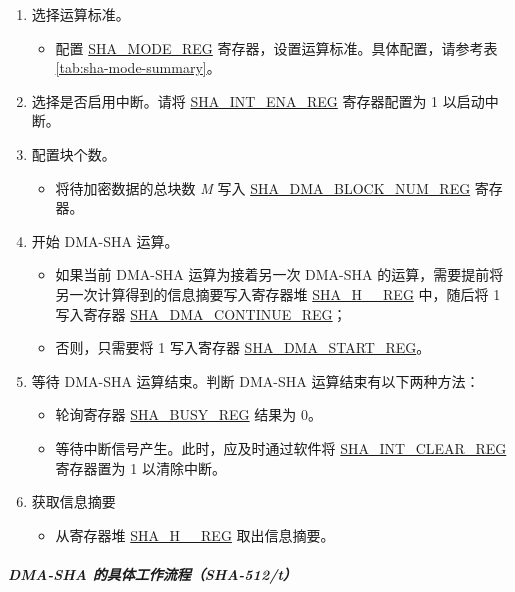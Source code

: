 \documentclass[main\_\_CN.tex]{subfiles}
\begin{document}
\begin{enumerate}
    \item 选择运算标准。
    \begin{itemize}
        \item 配置 \hyperref[regdesc:SHAMODEREG]{SHA\_MODE\_REG} 寄存器，设置运算标准。具体配置，请参考表 \ref{tab:sha-mode-summary}。
    \end{itemize}
    \item 选择是否启用中断。请将 \hyperref[regdesc:SHAINTENAREG]{SHA\_INT\_ENA\_REG} 寄存器配置为 1 以启动中断。
    \item 配置块个数。
    \begin{itemize}
        \item  将待加密数据的总块数 {\it{M}} 写入  \hyperref[regdesc:SHADMABLOCKNUMREG]{SHA\_DMA\_BLOCK\_NUM\_REG} 寄存器。
    \end{itemize}
    \item 开始 DMA-SHA 运算。
        \begin{itemize}
            \item 如果当前 DMA-SHA 运算为接着另一次 DMA-SHA 的运算，需要提前将另一次计算得到的信息摘要写入寄存器堆 \hyperref[regdesc:SHAHNREG]{SHA\_H\_\_REG} 中，随后将 1 写入寄存器 \hyperref[regdesc:SHADMACONTINUEREG]{SHA\_DMA\_CONTINUE\_REG}；
            \item 否则，只需要将 1 写入寄存器 \hyperref[regdesc:SHADMASTARTREG]{SHA\_DMA\_START\_REG}。
        \end{itemize}
    \item 等待 DMA-SHA 运算结束。判断 DMA-SHA 运算结束有以下两种方法：
        \begin{itemize}
            \item 轮询寄存器 \hyperref[regdesc:SHABUSYREG]{SHA\_BUSY\_REG} 结果为 0。
            \item 等待中断信号产生。此时，应及时通过软件将 \hyperref[regdesc:SHAINTCLEARREG]{SHA\_INT\_CLEAR\_REG} 寄存器置为 1 以清除中断。
        \end{itemize}

    \item 获取信息摘要
    \begin{itemize}
        \item 从寄存器堆 \hyperref[regdesc:SHAHNREG]{SHA\_H\_\_REG} 取出信息摘要。
    \end{itemize}
\end{enumerate}

\subparagraph{DMA-SHA 的具体工作流程（SHA-512/{\it{t}}）}
\end{document}
